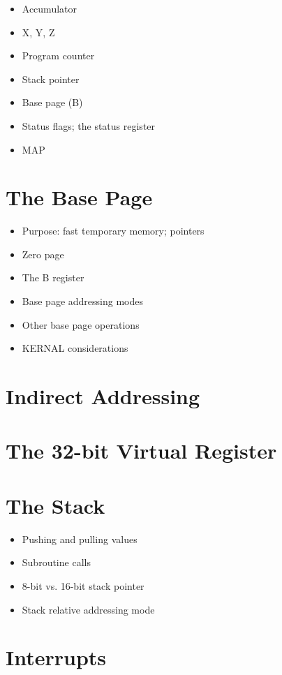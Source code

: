 \begin{itemize}
    \item Accumulator
\item X, Y, Z
\item Program counter
\item Stack pointer
\item Base page (B)
\item Status flags; the status register
\item MAP
\end{itemize}

\section{The Base Page}

\begin{itemize}
    \item Purpose: fast temporary memory; pointers
\item Zero page
\item The B register
\item Base page addressing modes
\item Other base page operations
\item KERNAL considerations
\end{itemize}

\section{Indirect Addressing}


\section{The 32-bit Virtual Register}


\section{The Stack}

\begin{itemize}
    \item Pushing and pulling values
\item Subroutine calls
\item 8-bit vs. 16-bit stack pointer
\item Stack relative addressing mode
\end{itemize}

\section{Interrupts}

